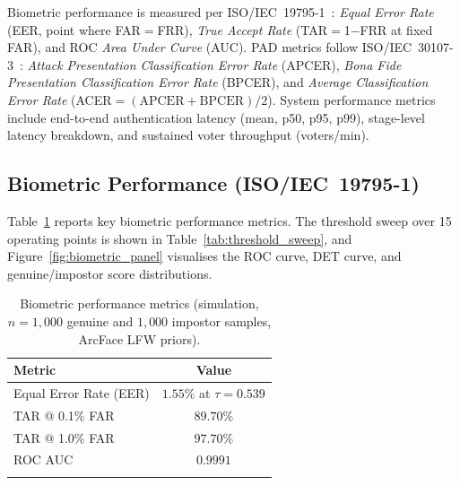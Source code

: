 \documentclass[pdflatex,sn-mathphys-num]{sn-jnl}%
\theoremstyle{thmstyleone}%
\theoremstyle{thmstyletwo}%
\theoremstyle{thmstylethree}%
\begin{document}
Biometric performance is measured per ISO/IEC~19795-1~\cite{iso19795}:
\textit{Equal Error Rate} (EER, point where FAR$=$FRR), \textit{True Accept Rate}
(TAR$=$1$-$FRR at fixed FAR), and ROC \textit{Area Under Curve} (AUC). PAD
metrics follow ISO/IEC~30107-3~\cite{iso30107}: \textit{Attack Presentation
Classification Error Rate} (APCER), \textit{Bona Fide Presentation
Classification Error Rate} (BPCER), and \textit{Average Classification Error
Rate} (ACER$=(\text{APCER}+\text{BPCER})/2$). System performance metrics include
end-to-end authentication latency (mean, p50, p95, p99), stage-level latency
breakdown, and sustained voter throughput (voters/min).

\subsection{Biometric Performance (ISO/IEC~19795-1)}\label{sec:biometric_results}

Table~\ref{tab:biometric} reports key biometric performance metrics. The
threshold sweep over 15 operating points is shown in
Table~\ref{tab:threshold_sweep}, and Figure~\ref{fig:biometric_panel}
visualises the ROC curve, DET curve, and genuine/impostor score distributions.

\begin{table}[t]
\caption{Biometric performance metrics (simulation, $n=1{,}000$ genuine
  and $1{,}000$ impostor samples, ArcFace LFW priors).}
\label{tab:biometric}%
\begin{tabular}{@{}lc@{}}
  \toprule
  Metric & Value \\
  \midrule
  Equal Error Rate (EER) & $1.55\%$ at $\tau = 0.539$ \\
  TAR @ 0.1\% FAR & $89.70\%$ \\
  TAR @ 1.0\% FAR & $97.70\%$ \\
  ROC AUC & $0.9991$ \\
  \botrule
\end{tabular}
\end{table}
\end{document}
